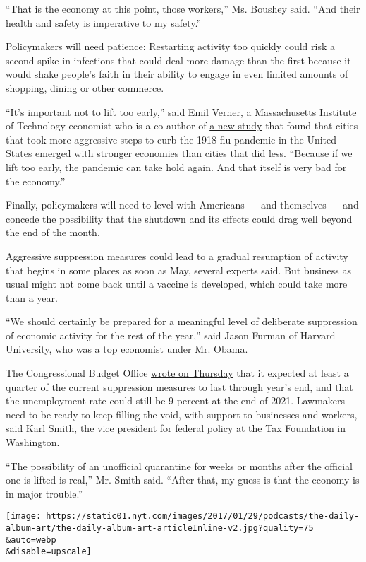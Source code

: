 ``That is the economy at this point, those workers,'' Ms. Boushey said.
``And their health and safety is imperative to my safety.''

Policymakers will need patience: Restarting activity too quickly could
risk a second spike in infections that could deal more damage than the
first because it would shake people's faith in their ability to engage
in even limited amounts of shopping, dining or other commerce.

``It's important not to lift too early,'' said Emil Verner, a
Massachusetts Institute of Technology economist who is a co-author of
\href{https://papers.ssrn.com/sol3/papers.cfm?abstract_id=3561560}{a new
study} that found that cities that took more aggressive steps to curb
the 1918 flu pandemic in the United States emerged with stronger
economies than cities that did less. ``Because if we lift too early, the
pandemic can take hold again. And that itself is very bad for the
economy.''

Finally, policymakers will need to level with Americans --- and
themselves --- and concede the possibility that the shutdown and its
effects could drag well beyond the end of the month.

Aggressive suppression measures could lead to a gradual resumption of
activity that begins in some places as soon as May, several experts
said. But business as usual might not come back until a vaccine is
developed, which could take more than a year.

``We should certainly be prepared for a meaningful level of deliberate
suppression of economic activity for the rest of the year,'' said Jason
Furman of Harvard University, who was a top economist under Mr. Obama.

The Congressional Budget Office
\href{https://www.cbo.gov/publication/56314}{wrote on Thursday} that it
expected at least a quarter of the current suppression measures to last
through year's end, and that the unemployment rate could still be 9
percent at the end of 2021. Lawmakers need to be ready to keep filling
the void, with support to businesses and workers, said Karl Smith, the
vice president for federal policy at the Tax Foundation in Washington.

``The possibility of an unofficial quarantine for weeks or months after
the official one is lifted is real,'' Mr. Smith said. ``After that, my
guess is that the economy is in major trouble.''

\texttt{[image: https://static01.nyt.com/images/2017/01/29/podcasts/the-daily-album-art/the-daily-album-art-articleInline-v2.jpg?quality=75\\\&auto=webp\\\&disable=upscale]}

